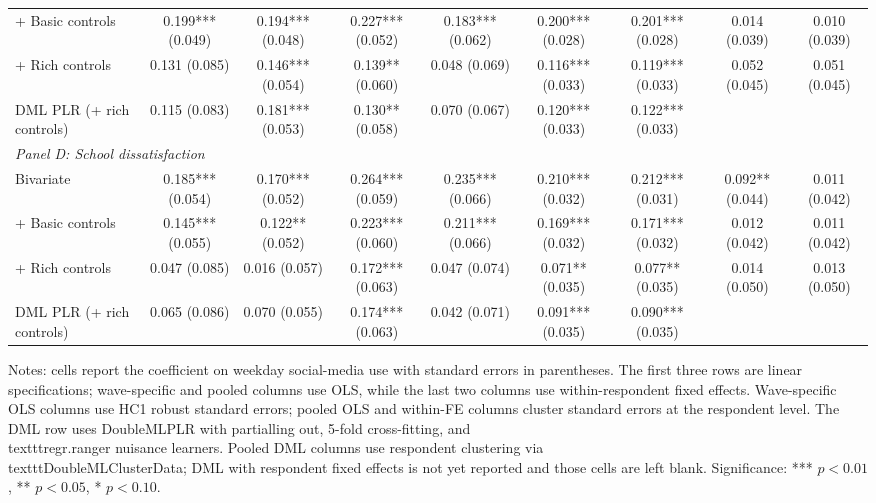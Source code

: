 \begin{table}[!htbp]
{\begin{tabular}{lcccccccc}
\\
+ Basic controls & 0.199*** (0.049) & 0.194*** (0.048) & 0.227*** (0.052) & 0.183*** (0.062) & 0.200*** (0.028) & 0.201*** (0.028) & 0.014 (0.039) & 0.010 (0.039)
\\
+ Rich controls & 0.131 (0.085) & 0.146*** (0.054) & 0.139** (0.060) & 0.048 (0.069) & 0.116*** (0.033) & 0.119*** (0.033) & 0.052 (0.045) & 0.051 (0.045)
\\
DML PLR (+ rich controls) & 0.115 (0.083) & 0.181*** (0.053) & 0.130** (0.058) & 0.070 (0.067) & 0.120*** (0.033) & 0.122*** (0.033) &  & 
\\
\hline
\multicolumn{9}{l}{\textit{Panel D: School dissatisfaction}} \\
\hline
Bivariate & 0.185*** (0.054) & 0.170*** (0.052) & 0.264*** (0.059) & 0.235*** (0.066) & 0.210*** (0.032) & 0.212*** (0.031) & 0.092** (0.044) & 0.011 (0.042)
\\
+ Basic controls & 0.145*** (0.055) & 0.122** (0.052) & 0.223*** (0.060) & 0.211*** (0.066) & 0.169*** (0.032) & 0.171*** (0.032) & 0.012 (0.042) & 0.011 (0.042)
\\
+ Rich controls & 0.047 (0.085) & 0.016 (0.057) & 0.172*** (0.063) & 0.047 (0.074) & 0.071** (0.035) & 0.077** (0.035) & 0.014 (0.050) & 0.013 (0.050)
\\
DML PLR (+ rich controls) & 0.065 (0.086) & 0.070 (0.055) & 0.174*** (0.063) & 0.042 (0.071) & 0.091*** (0.035) & 0.090*** (0.035) &  & 
\\
\hline
\end{tabular}
}
\begin{minipage}{0.95\textwidth}
\footnotesize Notes: cells report the coefficient on weekday social-media use with standard errors in parentheses. The first three rows are linear specifications; wave-specific and pooled columns use OLS, while the last two columns use within-respondent fixed effects. Wave-specific OLS columns use HC1 robust standard errors; pooled OLS and within-FE columns cluster standard errors at the respondent level. The DML row uses DoubleMLPLR with partialling out, 5-fold cross-fitting, and \\texttt{regr.ranger} nuisance learners. Pooled DML columns use respondent clustering via \\texttt{DoubleMLClusterData}; DML with respondent fixed effects is not yet reported and those cells are left blank. Significance: *** \(p < 0.01\), ** \(p < 0.05\), * \(p < 0.10\).
\end{minipage}
\end{table}

